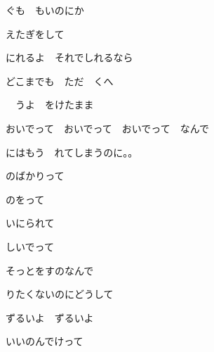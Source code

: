 \documentclass[a4paper,tate,twocolumn,12pt]{ltjtarticle}
\begin{document}
\begin{flushleft}
\vspace{2em}

\noindent\begin{minipage}{\linewidth}
ぐも　もいのにか

えたぎをして

にれるよ　それでしれるなら

どこまでも　ただ　くへ
\end{minipage}

\vspace{2em}

\noindent\begin{minipage}{\linewidth}
　うよ　をけたまま

おいでって　おいでって　おいでって　なんで

にはもう　れてしまうのに。。
\end{minipage}

\vspace{3em}

\noindent\begin{minipage}{\linewidth}
のばかりって

のをって

いにられて

しいでって
\end{minipage}

\vspace{2em}

\noindent\begin{minipage}{\linewidth}
そっとをすのなんで

りたくないのにどうして
\end{minipage}

\vspace{2em}

\noindent\begin{minipage}{\linewidth}
ずるいよ　ずるいよ

いいのんでけって


\end{minipage}
\end{flushleft}
\end{document}
